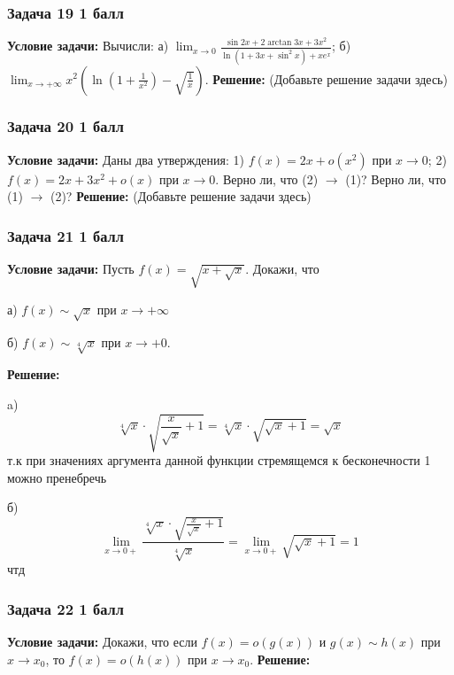 \documentclass[a4paper,12pt]{article}
\begin{document}
\vspace{1cm}

\subsubsection{Задача 19 \hfill 1 балл}
\textbf{Условие задачи:} Вычисли:
а) \( \lim_{x \to 0} \frac{\sin 2x + 2 \arctan 3x + 3x^2}{\ln(1 + 3x + \sin^2 x) + x e^x} \);
б) \( \lim_{x \to +\infty} x^2 \left( \ln \left( 1 + \frac{1}{x^2} \right) - \sqrt{\frac{1}{x}} \right) \).
\textbf{Решение: } (Добавьте решение задачи здесь)

\vspace{1cm}

\subsubsection{Задача 20 \hfill 1 балл}
\textbf{Условие задачи:} Даны два утверждения:
1) \( f(x) = 2x + o(x^2) \) при \( x \to 0 \);
2) \( f(x) = 2x + 3x^2 + o(x) \) при \( x \to 0 \).
Верно ли, что (2) $\rightarrow$ (1)? Верно ли, что (1) $\rightarrow$ (2)?
\textbf{Решение: } (Добавьте решение задачи здесь)

\vspace{1cm}

\subsubsection{Задача 21 \hfill 1 балл}
\textbf{Условие задачи:} Пусть \( f(x) = \sqrt{x+\sqrt{x}} \). Докажи, что

а) \( f(x) \sim \sqrt{x} \) при \( x \to +\infty \)

б) \( f(x) \sim \sqrt[4]{x} \) при \( x \to +0 \).

\textbf{Решение: }

a)
\[
\sqrt[4]{x} \cdot \sqrt{\frac{x}{\sqrt{x}} + 1} = \sqrt[4]{x} \cdot \sqrt{\sqrt{x} + 1} = \sqrt{x}
\]
т.к при значениях аргумента данной функции стремящемся к бесконечности 1 можно пренебречь

б)
\[
\lim_{x \to 0+} \frac{\sqrt[4]{x} \cdot \sqrt{\frac{x}{\sqrt{x}} + 1}}{\sqrt[4]{x}} = \lim_{x \to 0+} \sqrt{\sqrt{x}+1} = 1
\]
чтд




\vspace{1cm}

\subsubsection{Задача 22 \hfill 1 балл}
\textbf{Условие задачи:} Докажи, что если \( f(x) = o(g(x)) \) и \( g(x) \sim h(x) \) при \( x \to x_0 \), то \( f(x) = o(h(x)) \) при \( x \to x_0 \).
\textbf{Решение: }
\end{document}
